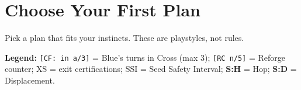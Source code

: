 \documentclass[11pt]{article}
\newcommand{\code}[1]{\texttt{#1}}
\newcommand{\code}[1]{\texttt{#1}}
\begin{document}
\clearpage

\section{Choose Your First Plan}
Pick a plan that fits your instincts. These are playstyles, not rules.



\noindent\textbf{Legend:}
\code{[CF: in a/3]} = Blue's turns in Cross (max 3); 
\code{[RC n/5]} = Reforge counter; 
XS = exit certifications; 
SSI = Seed Safety Interval; 
\textbf{S:H} = Hop; \textbf{S:D} = Displacement.

\end{document}
